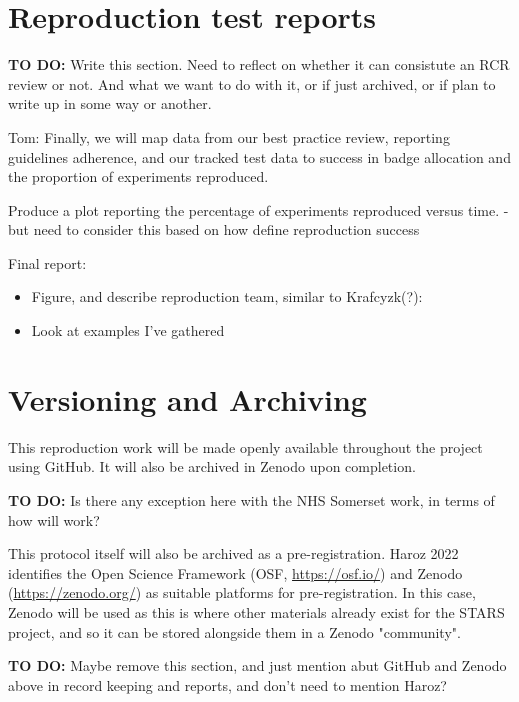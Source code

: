 \section{Reproduction test reports}


\textbf{TO DO:} Write this section. Need to reflect on whether it can consistute an RCR review or not. And what we want to do with it, or if just archived, or if plan to write up in some way or another.

Tom: Finally, we will map data from our best practice review, reporting guidelines adherence, and our tracked test data to success in badge allocation and the proportion of experiments reproduced.

Produce a plot reporting the percentage of experiments reproduced versus time. - but need to consider this based on how define reproduction success

Final report:
\begin{itemize}
    \item Figure, and describe reproduction team, similar to Krafcyzk(?):\autocite{krafczyk_learning_2021}
    \item Look at examples I've gathered
\end{itemize}

\section{Versioning and Archiving}

This reproduction work will be made openly available throughout the project using GitHub. It will also be archived in Zenodo upon completion.

\textbf{TO DO:} Is there any exception here with the NHS Somerset work, in terms of how will work?

This protocol itself will also be archived as a pre-registration. Haroz 2022 identifies the Open Science Framework (OSF, \url{https://osf.io/}) and Zenodo (\url{https://zenodo.org/}) as suitable platforms for pre-registration.\autocite{haroz_comparison_2022} In this case, Zenodo will be used as this is where other materials already exist for the STARS project, and so it can be stored alongside them in a Zenodo "community".

\textbf{TO DO:} Maybe remove this section, and just mention abut GitHub and Zenodo above in record keeping and reports, and don't need to mention Haroz?


